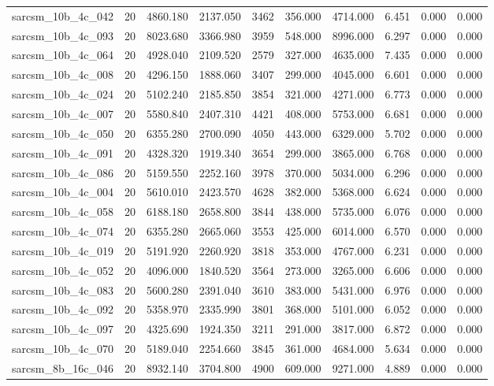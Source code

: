 \begin{tabular}{lrrrrrrrrr}
sarcsm\_10b\_4c\_042 & 20 & 4860.180 & 2137.050 & 3462 & 356.000 & 4714.000 & 6.451 & 0.000 & 0.000 \\
sarcsm\_10b\_4c\_093 & 20 & 8023.680 & 3366.980 & 3959 & 548.000 & 8996.000 & 6.297 & 0.000 & 0.000 \\
sarcsm\_10b\_4c\_064 & 20 & 4928.040 & 2109.520 & 2579 & 327.000 & 4635.000 & 7.435 & 0.000 & 0.000 \\
sarcsm\_10b\_4c\_008 & 20 & 4296.150 & 1888.060 & 3407 & 299.000 & 4045.000 & 6.601 & 0.000 & 0.000 \\
sarcsm\_10b\_4c\_024 & 20 & 5102.240 & 2185.850 & 3854 & 321.000 & 4271.000 & 6.773 & 0.000 & 0.000 \\
sarcsm\_10b\_4c\_007 & 20 & 5580.840 & 2407.310 & 4421 & 408.000 & 5753.000 & 6.681 & 0.000 & 0.000 \\
sarcsm\_10b\_4c\_050 & 20 & 6355.280 & 2700.090 & 4050 & 443.000 & 6329.000 & 5.702 & 0.000 & 0.000 \\
sarcsm\_10b\_4c\_091 & 20 & 4328.320 & 1919.340 & 3654 & 299.000 & 3865.000 & 6.768 & 0.000 & 0.000 \\
sarcsm\_10b\_4c\_086 & 20 & 5159.550 & 2252.160 & 3978 & 370.000 & 5034.000 & 6.296 & 0.000 & 0.000 \\
sarcsm\_10b\_4c\_004 & 20 & 5610.010 & 2423.570 & 4628 & 382.000 & 5368.000 & 6.624 & 0.000 & 0.000 \\
sarcsm\_10b\_4c\_058 & 20 & 6188.180 & 2658.800 & 3844 & 438.000 & 5735.000 & 6.076 & 0.000 & 0.000 \\
sarcsm\_10b\_4c\_074 & 20 & 6355.280 & 2665.060 & 3553 & 425.000 & 6014.000 & 6.570 & 0.000 & 0.000 \\
sarcsm\_10b\_4c\_019 & 20 & 5191.920 & 2260.920 & 3818 & 353.000 & 4767.000 & 6.231 & 0.000 & 0.000 \\
sarcsm\_10b\_4c\_052 & 20 & 4096.000 & 1840.520 & 3564 & 273.000 & 3265.000 & 6.606 & 0.000 & 0.000 \\
sarcsm\_10b\_4c\_083 & 20 & 5600.280 & 2391.040 & 3610 & 383.000 & 5431.000 & 6.976 & 0.000 & 0.000 \\
sarcsm\_10b\_4c\_092 & 20 & 5358.970 & 2335.990 & 3801 & 368.000 & 5101.000 & 6.052 & 0.000 & 0.000 \\
sarcsm\_10b\_4c\_097 & 20 & 4325.690 & 1924.350 & 3211 & 291.000 & 3817.000 & 6.872 & 0.000 & 0.000 \\
sarcsm\_10b\_4c\_070 & 20 & 5189.040 & 2254.660 & 3845 & 361.000 & 4684.000 & 5.634 & 0.000 & 0.000 \\
sarcsm\_8b\_16c\_046 & 20 & 8932.140 & 3704.800 & 4900 & 609.000 & 9271.000 & 4.889 & 0.000 & 0.000 \\

\end{tabular}
